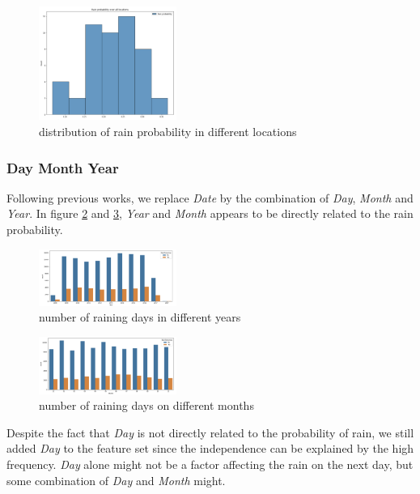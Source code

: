 \documentclass{article}
\begin{document}
\begin{figure}[h!]
\centering
\includegraphics[width=0.4\textwidth]{location.png}
\caption{distribution of rain probability in different locations}
\label{fig:location}
\end{figure}

\subsubsection{Day Month Year}

Following previous works, we replace \textit{Date} by the combination of \textit{Day}, \textit{Month} and \textit{Year}. In figure \ref{fig:year} and \ref{fig:month}, \textit{Year} and \textit{Month} appears to be directly related to the rain probability.

\begin{figure}[h!]
\centering
\includegraphics[width=0.4\textwidth]{year.png}
\caption{number of raining days in different years}
\label{fig:year}
\end{figure}

\begin{figure}[h!]
\centering
\includegraphics[width=0.4\textwidth]{month.png}
\caption{number of raining days on different months}
\label{fig:month}
\end{figure}

Despite the fact that \textit{Day} is not directly related to the probability of rain, we still added \textit{Day} to the feature set since the independence can be explained by the high frequency. \textit{Day} alone might not be a factor affecting the rain on the next day, but some combination of \textit{Day} and \textit{Month} might.
\end{document}
